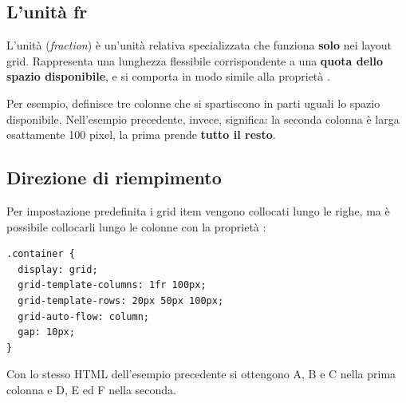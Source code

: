 \subsection{L'unità fr}

L'unità  (\textit{fraction}) è un'unità relativa specializzata che
funziona \textbf{solo} nei layout grid. Rappresenta una lunghezza flessibile
corrispondente a una \textbf{quota dello spazio disponibile}, e si comporta in
modo simile alla proprietà .

Per esempio,  definisce tre colonne
che si spartiscono in parti uguali lo spazio disponibile. Nell'esempio
precedente, invece,  significa: la seconda colonna è larga
esattamente 100 pixel, la prima prende \textbf{tutto il resto}.

\subsection{Direzione di riempimento}

Per impostazione predefinita i grid item vengono collocati lungo le righe, ma è
possibile collocarli lungo le colonne con la proprietà
:

\begin{affianco}[0.55]
\begin{lstlisting}[style=css]
.container {
  display: grid;
  grid-template-columns: 1fr 100px;
  grid-template-rows: 20px 50px 100px;
  grid-auto-flow: column;
  gap: 10px;
}
\end{lstlisting}
\risultato
\begin{browser}
\end{browser}
\end{affianco}

Con lo stesso HTML dell'esempio precedente si ottengono A, B e C nella prima
colonna e D, E ed F nella seconda.

